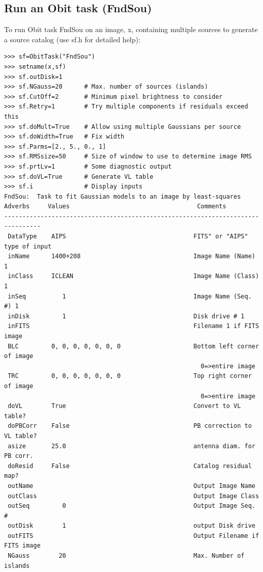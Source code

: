 \documentclass[11pt]{report}
\begin{document}
\subsection{Run an Obit task (FndSou)}
To run Obit task FndSou on an image, x, containing multiple sources to
generate a source catalog (use sf.h for detailed help):
\begin{verbatim}
>>> sf=ObitTask("FndSou")
>>> setname(x,sf)
>>> sf.outDisk=1
>>> sf.NGauss=20      # Max. number of sources (islands)
>>> sf.CutOff=2       # Minimum pixel brightness to consider
>>> sf.Retry=1        # Try multiple components if residuals exceed this
>>> sf.doMult=True    # Allow using multiple Gaussians per source
>>> sf.doWidth=True   # Fix width
>>> sf.Parms=[2., 5., 0., 1]
>>> sf.RMSsize=50     # Size of window to use to determine image RMS
>>> sf.prtLv=1        # Some diagnostic output
>>> sf.doVL=True      # Generate VL table
>>> sf.i              # Display inputs
FndSou:  Task to fit Gaussian models to an image by least-squares
Adverbs     Values                                   Comments
--------------------------------------------------------------------------------
 DataType    AIPS                                   FITS" or "AIPS" type of input
 inName      1400+208                               Image Name (Name) 1
 inClass     ICLEAN                                 Image Name (Class) 1
 inSeq          1                                   Image Name (Seq. #) 1
 inDisk         1                                   Disk drive # 1
 inFITS                                             Filename 1 if FITS image
 BLC         0, 0, 0, 0, 0, 0, 0                    Bottom left corner of image
                                                      0=>entire image
 TRC         0, 0, 0, 0, 0, 0, 0                    Top right corner of image
                                                      0=>entire image
 doVL        True                                   Convert to VL table?
 doPBCorr    False                                  PB correction to VL table?
 asize       25.0                                   antenna diam. for PB corr.
 doResid     False                                  Catalog residual map?
 outName                                            Output Image Name
 outClass                                           Output Image Class
 outSeq         0                                   Output Image Seq. #
 outDisk        1                                   output Disk drive
 outFITS                                            Output Filename if FITS image
 NGauss        20                                   Max. Number of islands

\end{verbatim}
\end{document}
